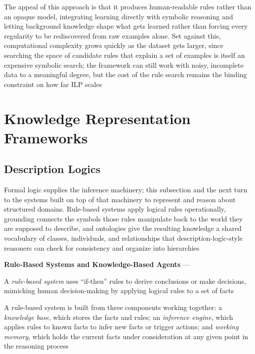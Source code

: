 The appeal of this approach is that it produces human-readable rules
rather than an opaque model, integrating learning directly with symbolic
reasoning and letting background knowledge shape what gets learned rather
than forcing every regularity to be rediscovered from raw examples alone.
Set against this, computational complexity grows quickly as the dataset
gets larger, since searching the space of candidate rules that explain a
set of examples is itself an expensive symbolic search; the framework can
still work with noisy, incomplete data to a meaningful degree, but the cost
of the rule search remains the binding constraint on how far ILP scales

\section{Knowledge Representation Frameworks}
\label{sec:knowledge-representation-frameworks}

\subsection{Description Logics}
\label{subsec:description-logics}

Formal logic supplies the inference machinery; this subsection and the
next turn to the systems built on top of that machinery to represent and
reason about structured domains. Rule-based systems apply logical rules
operationally, grounding connects the symbols those rules manipulate back
to the world they are supposed to describe, and ontologies give the
resulting knowledge a shared vocabulary of classes, individuals, and
relationships that description-logic-style reasoners can check for
consistency and organize into hierarchies

\textbf{Rule-Based Systems and Knowledge-Based Agents} --- \begin{definition}
  A \emph{rule-based system} uses ``if-then'' rules to derive conclusions or
  make decisions, mimicking human decision-making by applying logical rules
  to a set of facts
\end{definition}
A rule-based system is built from three components working together: a
\emph{knowledge base}, which stores the facts and rules; an \emph{inference
engine}, which applies rules to known facts to infer new facts or trigger
actions; and \emph{working memory}, which holds the current facts under
consideration at any given point in the reasoning process

